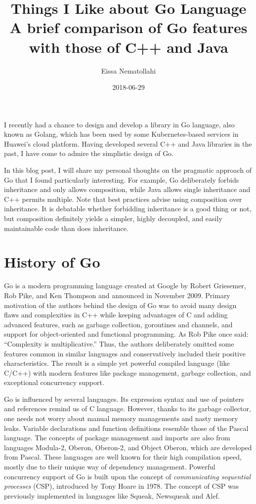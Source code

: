 \documentclass[11pt]{article}
\author{Eissa Nematollahi}
\date{2018-06-29}
\title{Things I Like about Go Language\\\medskip
\large A brief comparison of Go features with those of C++ and Java}
\begin{document}
\maketitle
I recently had a chance to design and develop a library in Go language, also known as Golang, which has been used by some Kubernetes-based services in Huawei's cloud platform. Having developed several C++ and Java libraries in the past, I have come to admire the simplistic design of Go.

In this blog post, I will share my personal thoughts on the pragmatic approach of Go that I found particularly interesting. For example, Go deliberately forbids inheritance and only allows composition, while Java allows single inheritance and C++ permits multiple. Note that best practices advise using composition over inheritance. It is debatable whether forbidding inheritance is a good thing or not, but composition definitely yields a simpler, highly decoupled, and easily maintainable code than does inheritance.


\section*{History of Go}
\label{sec:orgheadline1}
Go is a modern programming language created at Google by Robert Griesemer, Rob Pike, and Ken Thompson and announced in November 2009. Primary motivation of the authors behind the design of Go was to avoid many design flaws and complexities in C++ while keeping advantages of C and adding advanced features, such as garbage collection, goroutines and channels, and support for object-oriented and functional programming. As Rob Pike once said: ``Complexity is multiplicative.'' Thus, the authors deliberately omitted some features common in similar languages and conservatively included their positive characteristics. The result is a simple yet powerful compiled language (like C/C++) with modern features like package management, garbage collection, and exceptional concurrency support.

Go is influenced by several languages. Its expression syntax and use of pointers and references remind us of C language. However, thanks to its garbage collector, one needs not worry about manual memory managements and nasty memory leaks. Variable declarations and function definitions resemble those of the Pascal language. The concepts of package management and imports are also from languages Modula-2, Oberon, Oberon-2, and Object Oberon, which are developed from Pascal. These languages are well known for their high compilation speed, mostly due to their unique way of dependency management. Powerful concurrency support of Go is built upon the concept of \emph{communicating sequential processes} (CSP), introduced by Tony Hoare in 1978. The concept of CSP was previously implemented in languages like Squeak, Newsqueak and Alef.
\end{document}
